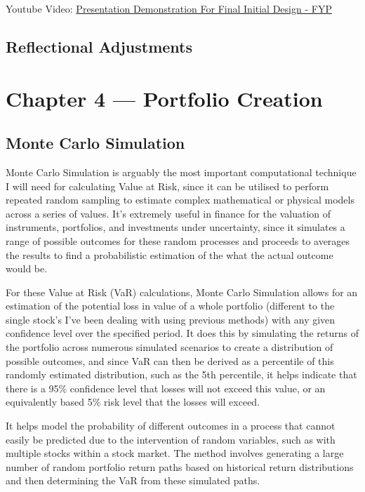 \documentclass{article}
\begin{document}
Youtube Video: \href{https://youtu.be/2GIWug_IESI}{Presentation Demonstration For Final Initial Design - FYP}

\subsection{Reflectional Adjustments}



\section{Chapter 4 --- Portfolio Creation}

\subsection{Monte Carlo Simulation}

Monte Carlo Simulation is arguably the most important computational technique I will need for calculating Value at Risk, since it can be utilised to perform repeated random sampling to estimate complex mathematical or physical models across a series of values. It's extremely useful in finance for the valuation of instruments, portfolios, and investments under uncertainty, since it simulates a range of possible outcomes for these random processes and proceeds to  averages the results to find a probabilistic estimation of the what the actual outcome would be.\\\vspace{0.3cm}

For these Value at Risk (VaR) calculations, Monte Carlo Simulation allows for an estimation of the potential loss in value of a whole portfolio (different to the single stock's I've been dealing with using previous methods) with any given confidence level over the specified period. It does this by simulating the returns of the portfolio across numerous simulated scenarios to create a distribution of possible outcomes, and since VaR can then be derived as a percentile of this randomly estimated distribution, such as the 5th percentile, it helps indicate that there is a 95\% confidence level that losses will not exceed this value, or an equivalently based 5\% risk level that the losses will exceed.\\\vspace{0.3cm}

It helps model the probability of different outcomes in a process that cannot easily be predicted due to the intervention of random variables, such as with multiple stocks within a stock market. The method involves generating a large number of random portfolio return paths based on historical return distributions and then determining the VaR from these simulated paths.\\\vspace{0.3cm}
\end{document}
